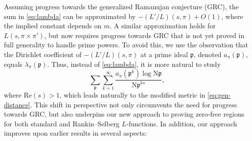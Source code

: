 \documentclass[12pt,reqno]{amsart}
\theoremstyle{remark}
\renewcommand{\Re}{\mathrm{Re}}
\numberwithin{equation}{section}
\begin{document}
    Assuming progress towards the generalized Ramanujan conjecture (GRC), the sum in \eqref{eq:lambda} can be approximated by $-(L'/L)(s, \pi) + O(1)$, where the implied constant depends on $m$. A similar approximation holds for $L(s, \pi \times \pi')$, but now requires progress towards GRC that is not yet proved in full generality to handle prime powers. To avoid this, we use the observation that the Dirichlet coefficient of $-(L'/L)(s, \pi)$ at a prime ideal $\mathfrak{p}$, denoted $a_{\pi}(\mathfrak{p})$, equals $\lambda_{\pi}(\mathfrak{p})$. Thus, instead of \eqref{eq:lambda}, it is more natural to study
\begin{equation} \label{eq:a-pi}
    \sum_{\mathfrak{p}} \sum_{k=1}^{\infty} \frac{a_{\pi}(\mathfrak{p}^{k}) \log \mathrm{N}\mathfrak{p}}{\mathrm{N}\mathfrak{p}^{ks}},
\end{equation}
where $ \Re(s) > 1 $, which leads naturally to the modified metric in \eqref{eq:gen-distance}. This shift in perspective not only circumvents the need for progress towards GRC, but also underpins our new approach to proving zero-free regions for both standard and Rankin--Selberg $L$-functions. In addition, our approach improves upon earlier results in several aspects:
\end{document}
